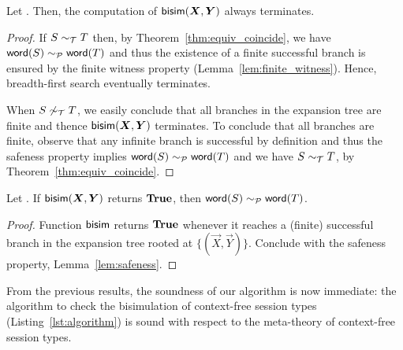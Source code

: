 \begin{lemma}[Termination]
  \label{lem:termination}
  Let \grmcontext. Then, the computation of $\Bisim(\vec X,\vec Y)$
  always terminates.
\end{lemma}
%
\begin{proof}
  If $S\sim_\mathcal T T$ then, by Theorem~\ref{thm:equiv_coincide}, we
  have $\mathsf{word}(S) \sim_\mathcal P \mathsf{word}(T) $ and thus the existence of a
  finite successful branch is ensured by the finite witness property
  (Lemma~\ref{lem:finite_witness}).  Hence, breadth-first search
  eventually terminates.
  
  When $S\not\sim_\mathcal T T$, we easily conclude that all branches in
  the expansion tree are finite and thence $\Bisim(\vec X,\vec Y)$
  terminates.  To conclude that all branches are finite, observe that
  any infinite branch is successful by definition and thus the
  safeness property implies $\mathsf{word}(S) \sim_\mathcal P \mathsf{word}(T)$ and we have
  $S\sim_\mathcal T T$, by Theorem~\ref{thm:equiv_coincide}.
\end{proof}


\begin{lemma}
  \label{lem:bisimilar-to-prod}
  Let \grmcontext.  If $\Bisim(\vec X,\vec Y)$ returns $\mathbf{True}$, then
  $\mathsf{word}(S) \sim_\mathcal P \mathsf{word}(T)$.
\end{lemma}

\begin{proof}
  Function $\mathsf{bisim}$ returns $\mathbf{True}$ whenever it reaches a (finite)
  successful branch in the expansion tree rooted at
  $\{(\vec X,\vec Y)\}$. Conclude with the safeness property,
  Lemma~\ref{lem:safeness}.
\end{proof}

From the previous results, the soundness of our algorithm is now
immediate: the algorithm to check the bisimulation of context-free
session types (Listing~\ref{lst:algorithm}) is sound with respect to
the meta-theory of context-free session types.

